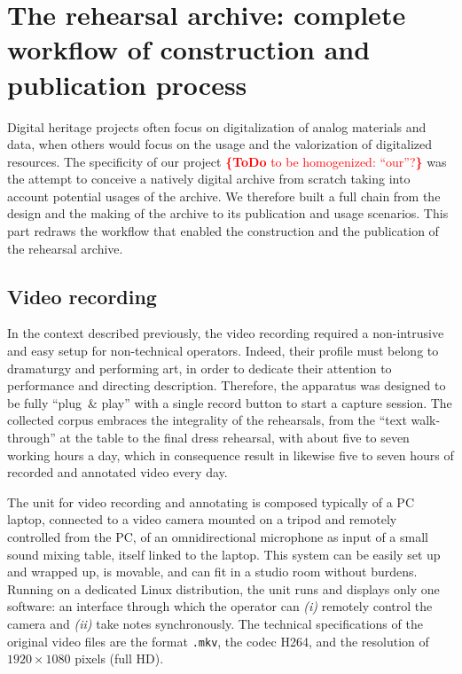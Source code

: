 \documentclass[conference]{IEEEtran}
\newcommand{\todo}[1]{\noindent\textcolor{red}{{\bf \{ToDo} #1{\bf \}}}}
\begin{document}
\section{The rehearsal archive: complete workflow of construction and publication process}
\label{sec:workflow}


Digital heritage projects often focus on digitalization of analog materials and data,
when others would focus on the usage and the valorization of digitalized resources.
The specificity of our project \todo{to be homogenized: ``our''?}
was the attempt to conceive a natively digital archive from scratch
taking into account potential usages of the archive.
We therefore built a full chain from the design and the making of the archive
to its publication and usage scenarios.
This part redraws the workflow that enabled the construction and the publication of the rehearsal archive.

\subsection{Video recording}
In the context described previously, the video recording required a non-intrusive and easy setup for non-technical operators. Indeed, their profile must belong to dramaturgy and performing art, in order to dedicate their attention to performance and directing description. Therefore, the apparatus was designed to be fully ``plug\ \& play'' with a single record button to start a capture session.
The collected corpus embraces the integrality of the rehearsals, from the ``text walk-through'' at the table to the final dress rehearsal, with about five to seven working hours a day, which in consequence result in likewise five to seven hours of recorded and annotated video every day.

The unit for video recording and annotating is composed typically of a PC laptop, connected to a video camera mounted on a tripod and remotely controlled from the PC, of an omnidirectional microphone as input of a small sound mixing table, itself linked to the laptop. This system can be easily set up and wrapped up, is movable, and can fit in a studio room without burdens. Running on a dedicated Linux distribution, the unit runs and displays only one software: an interface through which the operator can \emph{(i)} remotely control the camera and \emph{(ii)} take notes synchronously. 
The technical specifications of the original video files are the format \texttt{.mkv}, the codec H264, and the resolution of $1920 \times 1080$ pixels (full HD).
\end{document}
